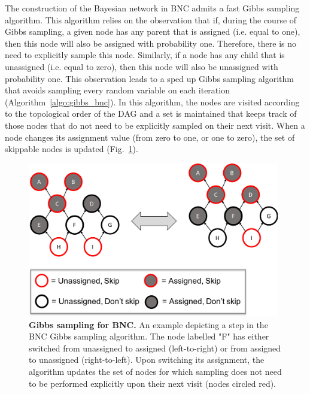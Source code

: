 The construction of the Bayesian network in BNC admits a fast Gibbs sampling algorithm.  This algorithm relies on the observation that if, during the course of Gibbs sampling, a given node has any parent that is assigned (i.e. equal to one), then this node will also be assigned with probability one. Therefore, there is no need to explicitly sample this node. Similarly, if a node has any child that is unassigned (i.e. equal to zero), then this node will also be unassigned with probability one.  This observation leads to a sped up Gibbs sampling algorithm that avoids sampling every random variable on each iteration (Algorithm~\ref{algo:gibbs_bnc}).  In this algorithm, the nodes are visited according to the topological order of the DAG and a set is maintained that keeps track of those nodes that do not need to be explicitly sampled on their next visit.  When a node changes its assignment value (from zero to one, or one to zero), the set of skippable nodes is updated (Fig.~\ref{fig:gibbs_bnc}).

\begin{figure}[!tpb]
\centerline{\includegraphics[width=11cm]{figures/gibbs_bnc.png}}
\caption{\textbf{Gibbs sampling for BNC.} An example depicting a step in the BNC Gibbs sampling algorithm. The node labelled "F" has either switched from unassigned to assigned (left-to-right) or from assigned to unassigned (right-to-left). Upon switching its assignment, the algorithm updates the set of nodes for which sampling does not need to be performed explicitly upon their next visit (nodes circled red).}
\label{fig:gibbs_bnc}
\end{figure}

